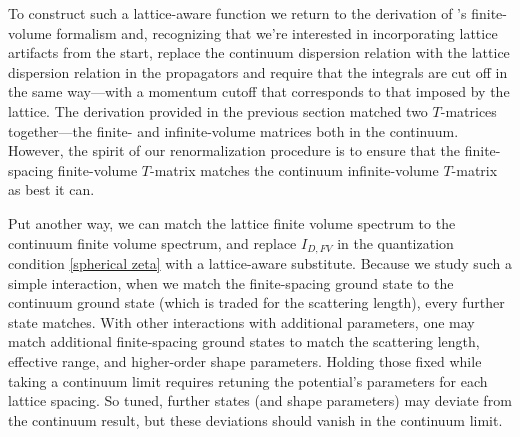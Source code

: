 To construct such a lattice-aware function we return to the derivation of \Luscher's finite-volume formalism and, recognizing that we're interested in incorporating lattice artifacts from the start, replace the continuum dispersion relation with the lattice dispersion relation in the propagators and require that the integrals are cut off in the same way---with a momentum cutoff that corresponds to that imposed by the lattice.
The derivation provided in the previous section matched two $T$-matrices together---the finite- and infinite-volume matrices both in the continuum.
However, the spirit of our renormalization procedure is to ensure that the finite-spacing finite-volume $T$-matrix matches the continuum infinite-volume $T$-matrix as best it can.

Put another way, we can match the lattice finite volume spectrum to the continuum finite volume spectrum, and replace $I_{D,FV}$ in the quantization condition \eqref{spherical zeta} with a lattice-aware substitute.
Because we study such a simple interaction, when we match the finite-spacing ground state to the continuum ground state (which is traded for the scattering length), every further state matches.
With other interactions with additional parameters, one may match additional finite-spacing ground states to match the scattering length, effective range, and higher-order shape parameters.
Holding those fixed while taking a continuum limit requires retuning the potential's parameters for each lattice spacing.
So tuned, further states (and shape parameters) may deviate from the continuum result, but these deviations should vanish in the continuum limit.

